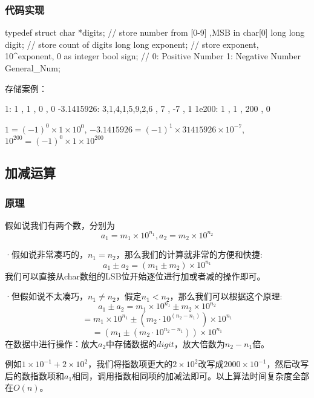 \documentclass[11pt]{article}
\begin{document}
\subsubsection{代码实现}
\begin{commandline}
typedef struct {
    char *digits;       // store number from [0-9] ,MSB in char[0]
    long long digit;    // store count of digits 
    long long exponent; // store exponent, 10^exponent, 0 as integer
    bool sign;          // 0: Positive Number 1: Negative Number
} General_Num;
\end{commandline}
存储案例：

\begin{commandline}
1:{ {1} , 1 , 0 , 0} 
-3.1415926:{ {3,1,4,1,5,9,2,6} , 7 , -7 , 1}
1e200:{ {1} , 1 , 200 , 0}
\end{commandline}
$1 = (-1)^0 \times 1 \times 10^0$,
$-3.1415926 = (-1)^1 \times 31415926 \times 10^{-7}$,
$10^{200} = (-1)^0 \times 1 \times 10^{200}$

\subsection{加减运算}
\subsubsection{原理}
假如说我们有两个数，分别为\[
a_1 = m_1 \times 10^{n_1} , a_2 = m_2 \times 10^{n_2}
\]


·假如说非常凑巧的，$n_1 = n_2$，那么我们的计算就非常的方便和快捷:\[
a_1 \pm a_2 = (m_1  \pm m_2) \times 10^{n_1}
\]我们可以直接从char数组的LSB位开始逐位进行加或者减的操作即可。


·但假如说不太凑巧，$n_1 \neq n_2$，假定$n_1<n_2$，那么我们可以根据这个原理:
\[
a_1 \pm a_2 = m_1 \times 10^{n_1} \pm m_2 \times 10^{n_2}
\]
\[
= m_1 \times 10^{n_1} \pm (m_2 \cdot 10^{(n_2 - n_1)}) \times 10^{n_1}
\]
\[
= \left( m_1 \pm (m_2 \cdot 10^{n_2 - n_1}) \right) \times 10^{n_1}
\]
在数据中进行操作：放大$a_2$中存储数据的$digit$，放大倍数为$n_2-n_1$倍。


例如$1 \times10^{-1} + 2\times 10^{2}$，我们将指数项更大的$2\times 10^2$改写成$2000 \times 10^{-1}$，然后改写后的数指数项和$a_1$相同，调用指数相同项的加减法即可。以上算法时间复杂度全部在$O(n)$。
\end{document}
